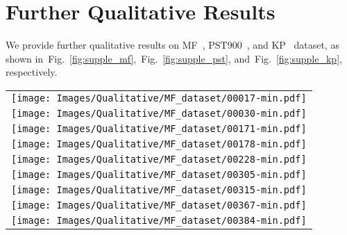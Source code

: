 \documentclass[10pt,twocolumn,letterpaper]{article}
\newcommand{\figref}[1]{Fig.~\ref{#1}}
\begin{document}
 
\section{Further Qualitative Results}
We provide further qualitative results on MF~\cite{ha2017mfnet}, PST900~\cite{shivakumar2019pst900}, and KP~\cite{hwang2015multispectral} dataset, as shown in~\figref{fig:supple_mf},~\figref{fig:supple_pst}, and~\figref{fig:supple_kp}, respectively.

\begin{figure*}[t]
\begin{center}
{
\begin{tabular}{c@{\hskip 0.005\linewidth}c@{\hskip 0.005\linewidth}c@{\hskip 0.005\linewidth}c@{\hskip 0.005\linewidth}c@{\hskip 0.005\linewidth}c}
\multicolumn{6}{c}{\texttt{[image: Images/Qualitative/MF\_dataset/00017-min.pdf]}} \vspace{-0.02in} \\
\multicolumn{6}{c}{\texttt{[image: Images/Qualitative/MF\_dataset/00030-min.pdf]}} \vspace{-0.02in} \\
\multicolumn{6}{c}{\texttt{[image: Images/Qualitative/MF\_dataset/00171-min.pdf]}} \vspace{-0.02in} \\
\multicolumn{6}{c}{\texttt{[image: Images/Qualitative/MF\_dataset/00178-min.pdf]}} \vspace{-0.02in} \\
\multicolumn{6}{c}{\texttt{[image: Images/Qualitative/MF\_dataset/00228-min.pdf]}} \vspace{-0.02in} \\ \multicolumn{6}{c}{\texttt{[image: Images/Qualitative/MF\_dataset/00305-min.pdf]}} \vspace{-0.02in} \\
\multicolumn{6}{c}{\texttt{[image: Images/Qualitative/MF\_dataset/00315-min.pdf]}} \vspace{-0.02in} \\
\multicolumn{6}{c}{\texttt{[image: Images/Qualitative/MF\_dataset/00367-min.pdf]}} \vspace{-0.02in} \\
\multicolumn{6}{c}{\texttt{[image: Images/Qualitative/MF\_dataset/00384-min.pdf]}} \vspace{-0.02in} \\

\end{tabular}}
\end{center}
\end{figure*}
\end{document}
